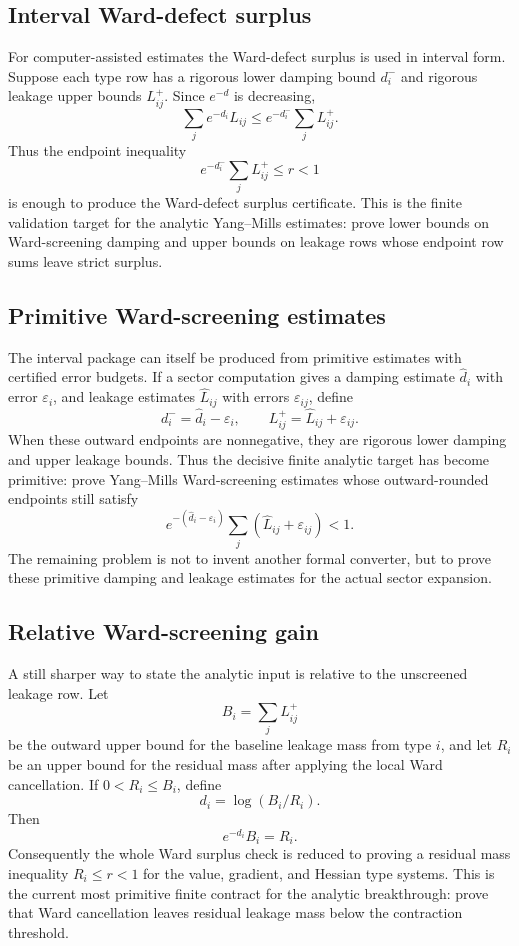 \subsection{Interval Ward-defect surplus}
For computer-assisted estimates the Ward-defect surplus is used in interval
form. Suppose each type row has a rigorous lower damping bound $d_i^-$ and
rigorous leakage upper bounds $L_{ij}^+$. Since $e^{-d}$ is decreasing,
\[
  \sum_j e^{-d_i}L_{ij}
  \le e^{-d_i^-}\sum_j L_{ij}^+ .
\]
Thus the endpoint inequality
\[
  e^{-d_i^-}\sum_j L_{ij}^+\le r<1
\]
is enough to produce the Ward-defect surplus certificate. This is the finite
validation target for the analytic Yang--Mills estimates: prove lower bounds
on Ward-screening damping and upper bounds on leakage rows whose endpoint row
sums leave strict surplus.

\subsection{Primitive Ward-screening estimates}
The interval package can itself be produced from primitive estimates with
certified error budgets. If a sector computation gives a damping estimate
\(\widehat d_i\) with error \(\varepsilon_i\), and leakage estimates
\(\widehat L_{ij}\) with errors \(\varepsilon_{ij}\), define
\[
  d_i^-=\widehat d_i-\varepsilon_i,\qquad
  L_{ij}^+=\widehat L_{ij}+\varepsilon_{ij}.
\]
When these outward endpoints are nonnegative, they are rigorous lower damping
and upper leakage bounds. Thus the decisive finite analytic target has become
primitive: prove Yang--Mills Ward-screening estimates whose outward-rounded
endpoints still satisfy
\[
  e^{-(\widehat d_i-\varepsilon_i)}
    \sum_j(\widehat L_{ij}+\varepsilon_{ij})<1.
\]
The remaining problem is not to invent another formal converter, but to prove
these primitive damping and leakage estimates for the actual sector expansion.

\subsection{Relative Ward-screening gain}
A still sharper way to state the analytic input is relative to the unscreened
leakage row. Let
\[
  B_i=\sum_j L_{ij}^+
\]
be the outward upper bound for the baseline leakage mass from type \(i\), and
let \(R_i\) be an upper bound for the residual mass after applying the local
Ward cancellation. If \(0<R_i\le B_i\), define
\[
  d_i=\log(B_i/R_i).
\]
Then
\[
  e^{-d_i}B_i=R_i.
\]
Consequently the whole Ward surplus check is reduced to proving a residual
mass inequality \(R_i\le r<1\) for the value, gradient, and Hessian type
systems. This is the current most primitive finite contract for the analytic
breakthrough: prove that Ward cancellation leaves residual leakage mass below
the contraction threshold.

